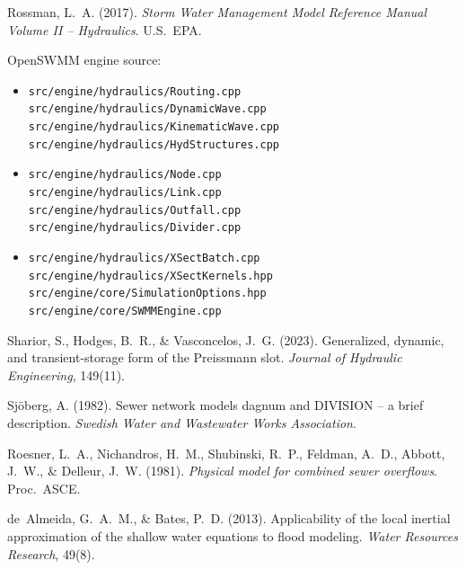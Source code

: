 \documentclass[11pt,a4paper]{article}
\newcommand{\src}[1]{\texttt{src/engine/#1}}
\begin{document}
\begin{enumerate}[nosep,label={[\arabic*]}]
  \item Rossman, L.~A. (2017). \emph{Storm Water Management Model Reference
        Manual Volume II -- Hydraulics}. U.S.\ EPA.
  \item OpenSWMM engine source:
        \begin{itemize}[nosep,itemsep=0pt]
          \item \src{hydraulics/Routing.cpp} \\
                \src{hydraulics/DynamicWave.cpp} \\
                \src{hydraulics/KinematicWave.cpp} \\
                \src{hydraulics/HydStructures.cpp}
          \item \src{hydraulics/Node.cpp} \\
                \src{hydraulics/Link.cpp} \\
                \src{hydraulics/Outfall.cpp} \\
                \src{hydraulics/Divider.cpp}
          \item \src{hydraulics/XSectBatch.cpp} \\
                \src{hydraulics/XSectKernels.hpp} \\
                \src{core/SimulationOptions.hpp} \\
                \src{core/SWMMEngine.cpp}
        \end{itemize}
  \item Sharior, S., Hodges, B.~R., \& Vasconcelos, J.~G. (2023).
        Generalized, dynamic, and transient-storage form of the Preissmann
        slot. \emph{Journal of Hydraulic Engineering}, 149(11).
  \item Sj{\"o}berg, A. (1982). Sewer network models dagnum and DIVISION --
        a brief description. \emph{Swedish Water and Wastewater Works
        Association}.
  \item Roesner, L.~A., Nichandros, H.~M., Shubinski, R.~P., Feldman, A.~D.,
        Abbott, J.~W., \& Delleur, J.~W. (1981). \emph{Physical model for
        combined sewer overflows}. Proc.\ ASCE.
  \item de~Almeida, G.~A.~M., \& Bates, P.~D. (2013). Applicability of the
        local inertial approximation of the shallow water equations to flood
        modeling. \emph{Water Resources Research}, 49(8).
\end{enumerate}
\end{document}
